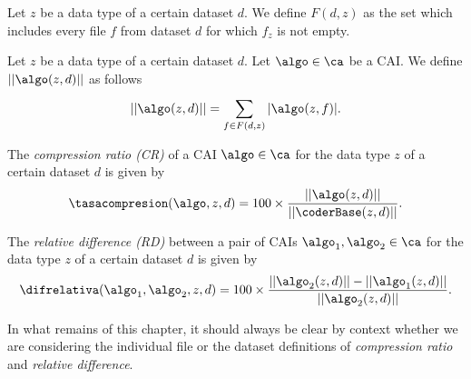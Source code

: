 \begin{defcion}
Let $z$ be a data type of a certain dataset $d$. We define $F(d, z)$ as the set which includes every file $f$ from dataset $d$ for which $f_z$ is not empty.
\end{defcion}


\begin{defcion}
Let $z$ be a data type of a certain dataset $d$. Let $\algo \in \ca$ be a CAI. We define $||\algo(z, d)||$ as follows
\vspace{-5pt}
\begin{equation}
\label{eq:dataset-size}
||\algo(z, d)||  = \sum_{f \in F(d, z)}^{} |\algo(z, f)|.
\end{equation}
\end{defcion}


\vspace{+3pt}
\begin{defcion}
The \textit{compression ratio (CR)} of a CAI $\algo \in \ca$ for the data type $z$ of a certain dataset $d$ is given by
\vspace{-5pt}
\begin{equation}
\label{eq:compression-rate-dataset}
\tasacompresion(\algo, z, d) = 100\times\frac{||\algo(z, d)||}{||\coderBase(z, d)||}.
\end{equation}
\end{defcion}


\vspace{+3pt}
\begin{defcion}
The \textit{relative difference (RD)} between a pair of CAIs $\algo_1, \algo_2 \in {\ca}$ for the data type $z$ of a certain dataset $d$ is given by
\vspace{-5pt}
\begin{equation}
\label{eq:relative-difference-dataset}
\difrelativa(\algo_1, \algo_2, z, d)  =
100\times\frac{||\algo_2 (z, d)|| - ||\algo_1 (z, d)||}{ ||\algo_2 (z, d)|| }.
\end{equation}
\end{defcion}


In what remains of this chapter, it should always be clear by context whether we are considering the individual file or the dataset definitions of \textit{compression ratio} and \textit{relative difference}.


\clearpage